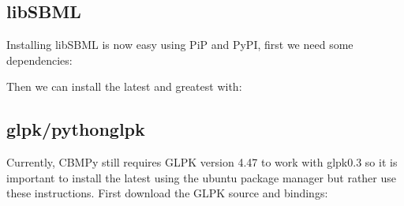 \documentclass[letterpaper,10pt,english]{sphinxmanual}
\begin{document}
\subsection{libSBML}
\label{\detokenize{install_doc:libsbml}}
\sphinxAtStartPar
Installing libSBML is now easy using PiP and PyPI, first we need some dependencies:

\begin{sphinxVerbatim}[commandchars=\\\{\}]
    
    
    
\end{sphinxVerbatim}

\sphinxAtStartPar
Then we can install the latest and greatest with:

\begin{sphinxVerbatim}[commandchars=\\\{\}]
   
\end{sphinxVerbatim}


\subsection{glpk/python\sphinxhyphen{}glpk}
\label{\detokenize{install_doc:glpk-python-glpk}}
\sphinxAtStartPar
Currently, CBMPy still requires GLPK version 4.47 to work with glpk\sphinxhyphen{}0.3 so it is important  to install the latest
using the ubuntu package manager but rather use these instructions. First download the GLPK source and bindings:

\begin{sphinxVerbatim}[commandchars=\\\{\}]
\end{sphinxVerbatim}
\end{document}
